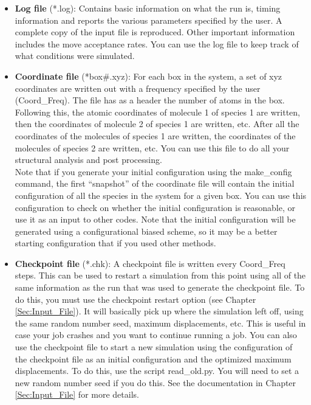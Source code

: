 \begin{itemize}

\item {\bf Log file} (*.log): Contains basic information on what the run is, timing information and reports the various parameters specified by the user. A complete copy of the input file is reproduced. Other important information includes the move acceptance rates. You can use the log file to keep track of what conditions were simulated.

\item {\bf Coordinate file} (*box\#.xyz): For each box in the system, a set of xyz coordinates are written out with a frequency specified by the user (Coord\_Freq). The file has as a header the number of atoms in the box. Following this, the atomic coordinates of molecule 1 of species 1 are written, then the coordinates of molecule 2 of species 1 are written, etc. After all the coordinates of the molecules of species 1 are written, the coordinates of the molecules of species 2 are written, etc. You can use this file to do all your structural analysis and post processing.\\

Note that if you generate your initial configuration using the make\_config command, the first ``snapshot'' of the coordinate file
will contain the initial configuration of all the species in the system for a given box. You can use this configuration to check on whether the initial configuration 
is reasonable, or use it as an input to other codes. Note that the initial configuration will be generated using a configurational biased scheme,  
so it may be a better starting configuration that if you used other methods. 

\item {\bf Checkpoint file} (*.chk): A checkpoint file is written every Coord\_Freq steps. This can be used to restart a simulation from this point using all of the same information as the run that was used to generate the checkpoint file. To do this, you must use the checkpoint restart option (see Chapter \ref{Sec:Input_File}). It will basically pick up where the simulation left off, using the same random number seed, maximum displacements, etc. This is useful in case your job crashes and you want to continue running a job. You can also use the checkpoint file to start a new simulation using the  configuration of the checkpoint file as an initial configuration and the optimized maximum displacements.  To do this, use the script read\_old.py. You will need to set a new random number seed if you do this. See the documentation in Chapter \ref{Sec:Input_File} for more details.


\end{itemize}
